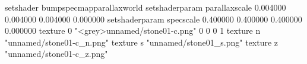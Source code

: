 setshader bumpspecmapparallaxworld
setshaderparam parallaxscale 0.004000 0.004000 0.004000 0.000000
setshaderparam specscale 0.400000 0.400000 0.400000 0.000000
texture 0 "<grey>unnamed/stone01-c.png" 0 0 0 1
texture n "unnamed/stone01-c_n.png"
texture s "unnamed/stone01_s.png"
texture z "unnamed/stone01-c_z.png"